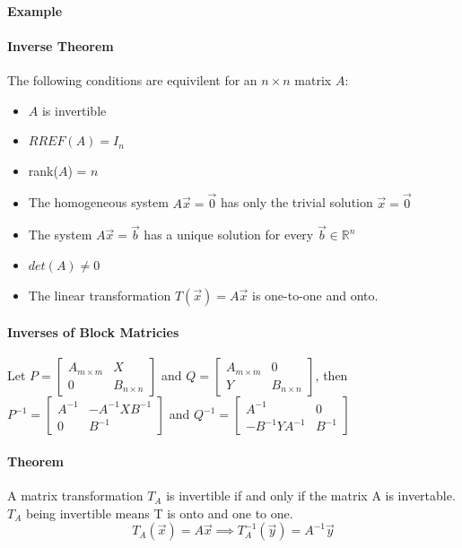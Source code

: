\paragraph*{Example} %

\paragraph*{Inverse Theorem}
The following conditions are equivilent for an $n \times n$ matrix $A$:
\begin{itemize}
    \item $A$ is invertible
    \item $RREF(A) = I_n$
    \item rank($A$) = $n$
    \item The homogeneous system $A\vec{x} = \vec{0}$ has only the trivial solution $\vec{x} = \vec{0}$
    \item The system $A\vec{x} = \vec{b}$ has a unique solution for every $\vec{b} \in \mathbb{R}^n$
    \item $det(A) \neq 0$
    \item The linear transformation $T(\vec{x}) = A\vec{x}$ is one-to-one and onto.
\end{itemize}

\paragraph*{Inverses of Block Matricies}
Let $P = \begin{bmatrix}
    A_{m \times m} & X \\
    0 & B_{n \times n}
\end{bmatrix}$ and $Q = \begin{bmatrix}
    A_{m \times m} & 0 \\
    Y & B_{n \times n}
\end{bmatrix}$, then $P^{-1} = \begin{bmatrix}
    A^{-1} & -A^{-1}XB^{-1} \\
    0 & B^{-1}
\end{bmatrix}$ and $Q^{-1} = \begin{bmatrix}
    A^{-1} & 0 \\
    -B^{-1}YA^{-1} & B^{-1}
\end{bmatrix}$

\paragraph*{Theorem}
A matrix transformation $T_A$ is invertible if and only if the matrix A is invertable. $T_A$ being invertible means T is onto and one to one.
\[T_A(\vec{x}) = A\vec{x} \implies T_A^{-1}(\vec{y}) = A^{-1}\vec{y}\]
